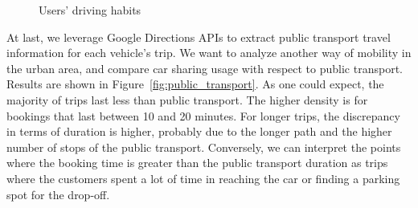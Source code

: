 \begin{figure}[t!]
\centering     %
{}
\caption{Users' driving habits}
\end{figure}



At last, we leverage Google Directions APIs to extract public transport travel information for each vehicle's trip. 
We want to analyze another way of mobility in the urban area, and compare car sharing usage with respect to public transport. Results are shown in Figure~\ref{fig:public_transport}.
As one could expect, the majority of trips last less than public transport. The higher density is for bookings that last between 10 and 20 minutes. For longer trips, the discrepancy in terms of duration is higher, probably due to the longer path and the higher number of stops of the public transport.
Conversely, we can interpret the points where the booking time is greater than  the public transport duration as trips where the customers spent a lot of time in reaching the car or finding a parking spot for the drop-off.

